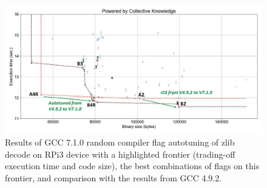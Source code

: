    \begin{figure}[!htbp]
     \centering
      \includegraphics[width=5.2in]
      {ck-assets/3f15a01f17d48b7b-cropped.pdf} %
      \vspace{0.1in}
      \vspace{0.1in}
     \caption{
       Results of GCC 7.1.0 random compiler flag autotuning of zlib decode on RPi3 device 
       with a highlighted frontier (trading-off execution time and code size), 
       the best combinations of flags on this frontier, and comparison with the results from GCC 4.9.2.
     }
     \label{fig:autotuning-zlib-decode-gcc7}
   \end{figure}

